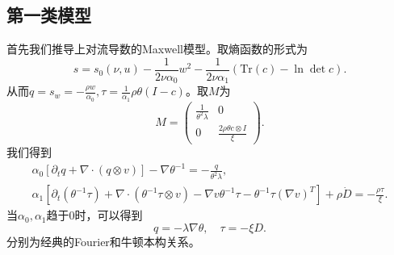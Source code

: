 \documentclass{article}
\begin{document}
	\subsection{第一类模型}
	首先我们推导上对流导数的Maxwell模型。取熵函数的形式为
	\begin{equation*}
			s = s_0(\nu,u)  - \frac{1}{2 \nu \alpha_0} w^2 - \frac{1}{2 \nu \alpha_1} (\mbox{Tr}(c) - \ln \det c).
	\end{equation*}
	从而$q=s_w=-\frac{\rho w}{\alpha_0},\tau = \frac{1}{\alpha_1} \rho \theta (I-c)$。取$M$为
	\begin{equation*}
		M = \left( \begin{array}{ccc} 
			\frac{1}{\theta^2 \lambda} & 0 \\
			0 &  \frac{2 \rho \theta c \otimes I}{\xi}   
		\end{array} \right).
	\end{equation*}
	我们得到
	\begin{eqnarray*}
		\alpha_0 [\partial_t q +  \nabla \cdot (q \otimes v)] - \nabla \theta^{-1} = -\frac{q}{\theta^2 \lambda}, \\
		\alpha_1[\partial_t (\theta^{-1} {\tau}) + \nabla \cdot (\theta^{-1} {\tau} \otimes v) - \nabla v \theta^{-1} \tau - \theta^{-1}\tau (\nabla v)^T] + \rho \dot{D} = -\frac{{\rho \tau}}{\xi}.
	\end{eqnarray*}
	当$\alpha_0, \alpha_1$趋于0时，可以得到
	\begin{equation*}
		q = -\lambda \nabla \theta, \quad \tau = - \xi {D} .
	\end{equation*}
	分别为经典的Fourier和牛顿本构关系。
\end{document}
